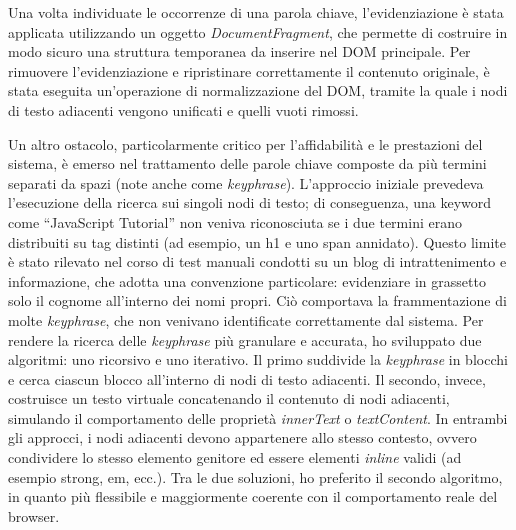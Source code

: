 \vspace{10pt}
\par\noindent Una volta individuate le occorrenze di una parola chiave, l’evidenziazione è stata applicata utilizzando un oggetto \textit{DocumentFragment}, che permette di costruire in modo sicuro una struttura temporanea da inserire nel DOM principale. Per rimuovere l’evidenziazione e ripristinare correttamente il contenuto originale, è stata eseguita un’operazione di normalizzazione del DOM, tramite la quale i nodi di testo adiacenti vengono unificati e quelli vuoti rimossi.

\vspace{10pt}
\par\noindent Un altro ostacolo, particolarmente critico per l’affidabilità e le prestazioni del sistema, è emerso nel trattamento delle parole chiave composte da più termini separati da spazi (note anche come \textit{keyphrase}). L’approccio iniziale prevedeva l’esecuzione della ricerca sui singoli nodi di testo; di conseguenza, una keyword come “JavaScript Tutorial” non veniva riconosciuta se i due termini erano distribuiti su tag distinti (ad esempio, un h1 e uno span annidato). Questo limite è stato rilevato nel corso di test manuali condotti su un blog di intrattenimento e informazione, che adotta una convenzione particolare: evidenziare in grassetto solo il cognome all’interno dei nomi propri. Ciò comportava la frammentazione di molte \textit{keyphrase}, che non venivano identificate correttamente dal sistema. Per rendere la ricerca delle \textit{keyphrase} più granulare e accurata, ho sviluppato due algoritmi: uno ricorsivo e uno iterativo. Il primo suddivide la \textit{keyphrase} in blocchi e cerca ciascun blocco all’interno di nodi di testo adiacenti. Il secondo, invece, costruisce un testo virtuale concatenando il contenuto di nodi adiacenti, simulando il comportamento delle proprietà \textit{innerText} o \textit{textContent}. In entrambi gli approcci, i nodi adiacenti devono appartenere allo stesso contesto, ovvero condividere lo stesso elemento genitore ed essere elementi \textit{inline} validi (ad esempio strong, em, ecc.). Tra le due soluzioni, ho preferito il secondo algoritmo, in quanto più flessibile e maggiormente coerente con il comportamento reale del browser.

